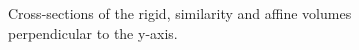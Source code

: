   	\begin{figure}[htbp]
  	  \centering
  	  \caption{Cross-sections of the rigid, similarity and affine volumes perpendicular to the y-axis.}
  	  \label{fig:hires_1_287}
  	\end{figure}

